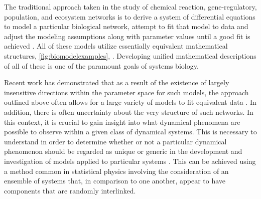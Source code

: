 The traditional approach taken in the study of chemical reaction, gene-regulatory, population, and ecosystem networks is to derive a system of differential equations to model a particular biological network, attempt to fit that model to data and adjust the modeling assumptions along with parameter values until a good fit is achieved \cite{Meyer2014}. All of these models utilize essentially equivalent mathematical structures, \ref{fig:biomodelexamples}, \cite{RossCr2003,Palsson2011a,Sauro2012}. Developing unified mathematical descriptions of all of these is one of the paramount goals of systems biology.

Recent work has demonstrated that as a result of the existence of largely insensitive directions within the parameter space for such models, the approach outlined above often allows for a large variety of models to fit equivalent data \cite{Machta2013,Hines2014,Prabakaran2014,Tonsing2014}. In addition, there is often uncertainty about the very structure of such networks. In this context, it is crucial to gain insight into what dynamical phenomena are possible to observe within a given class of dynamical systems. This is necessary to understand in order to determine whether or not a particular dynamical phenomenon should be regarded as unique or generic in the development and investigation of models applied to particular systems \cite{Gunawardena2013,Gunawardena2014}. This can be achieved using a method common in statistical physics involving the consideration of an ensemble of systems that, in comparison to one another, appear to have components that are randomly interlinked.


